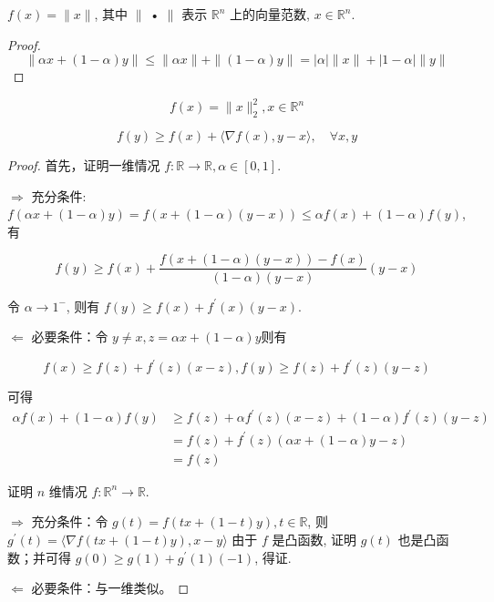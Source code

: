 \begin{example}
    \label{Example:NormIsConvex}
    $ f(x)=\|x\| $, 其中 $ \| $ • $ \| $ 表示 $ \mathbb{R}^{n} $ 上的向量范数, $ x \in \mathbb{R}^{n} $.
\end{example}

\begin{proof}
    \label{Example:L2NormIsConvex}
    $$ \|\alpha x+(1-\alpha) y\| \leq\|\alpha x\|+\|(1-\alpha) y\|=|\alpha|\|x\|+|1-\alpha|\|y\| $$
\end{proof}

\begin{example}
    $$ f(x)=\|x\|_{2}^{2}, x \in \mathbb{R}^{n} $$
\end{example}

\begin{theorem}
    \label{Theorem:ConvexDiffential}
    $$ f(y) \geq f(x)+\langle\nabla f(x), y-x\rangle, \quad \forall x, y $$
\end{theorem}

\begin{proof}
    首先，证明一维情况 $ f: \mathbb{R} \rightarrow \mathbb{R}, \alpha \in[0,1] $.

    $ \Rightarrow  $ 充分条件: $ f(\alpha x+(1-\alpha) y)=f(x+(1-\alpha)(y-x)) \leq \alpha f(x)+(1-\alpha) f(y) $,有

    $$ f(y) \geq f(x)+\frac{f(x+(1-\alpha)(y-x))-f(x)}{(1-\alpha)(y-x)}(y-x) $$

    令 $ \alpha \rightarrow 1^- $, 则有 $ f(y) \geq f(x)+f^{\prime}(x)(y-x) $.

    $ \Leftarrow  $ 必要条件：令 $ y \neq x, z=\alpha x+(1-\alpha) y$则有

    $$  f(x) \geq f(z)+f^{\prime}(z)(x-z), f(y) \geq f(z)+f^{\prime}(z)(y-z)  $$

    可得 
    $$\begin{aligned}
        \alpha f(x)+(1-\alpha) f(y) &\geq f(z)+\alpha f^{\prime}(z)(x-z)+(1-\alpha) f^{\prime}(z)(y-z) \\
        &=f(z)+f^{\prime}(z)(\alpha x+(1-\alpha) y-z) \\
        &=f(z)
    \end{aligned}
    $$

    证明 $ n $ 维情况 $ f: \mathbb{R}^{n} \rightarrow \mathbb{R} $.

    $ \Rightarrow $ 充分条件：令 $ g(t)=f(t x+(1-t) y), t \in \mathbb{R} $, 则 $ g^{\prime}(t)=\langle\nabla f(t x+(1-t) y), x-y\rangle $ 由于 $ f $ 是凸函数, 证明 $ g(t) $ 也是凸函数；并可得 $ g(0) \geq g(1)+g^{\prime}(1)(-1) $, 得证.

    $ \Leftarrow $ 必要条件：与一维类似。
\end{proof}

